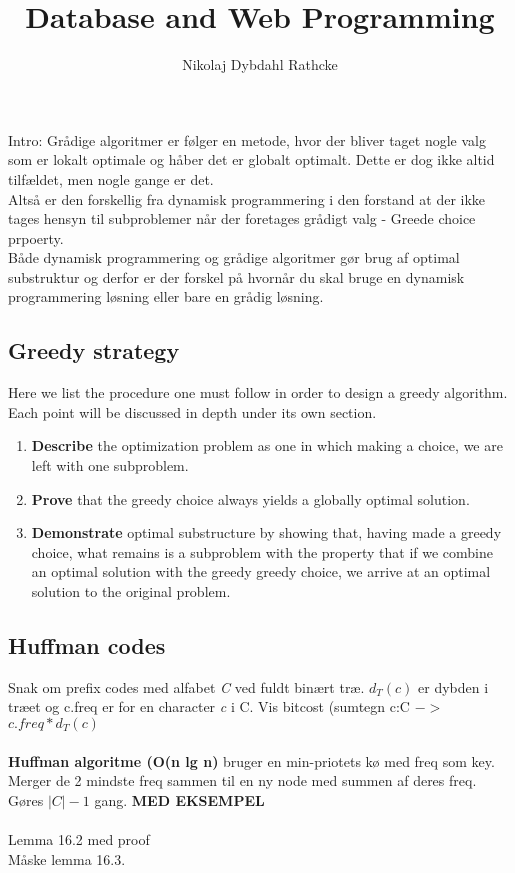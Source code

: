 \documentclass[12pt]{article}
\title{Database and Web Programming}
\author{Nikolaj Dybdahl Rathcke}
\begin{document}
Intro: Grådige algoritmer er følger en metode, hvor der bliver taget nogle valg som er lokalt optimale og håber det er globalt optimalt. Dette er dog ikke altid tilfældet, men nogle gange er det.\\
Altså er den forskellig fra dynamisk programmering i den forstand at der ikke tages hensyn til subproblemer når der foretages grådigt valg - Greede choice prpoerty.\\
Både dynamisk programmering og grådige algoritmer gør brug af optimal substruktur og derfor er der forskel på hvornår du skal bruge en dynamisk programmering løsning eller bare en grådig løsning.

\subsection*{Greedy strategy}
Here we list the procedure one must follow in order to design a greedy
algorithm. Each point will be discussed in depth under its own section.
\begin{enumerate}
	\item \textbf{Describe} the optimization problem as one in which making a
choice, we are left with one subproblem.
	\item \textbf{Prove} that the greedy choice always yields a globally
optimal solution.
	\item \textbf{Demonstrate} optimal substructure by showing that, having
made a greedy choice, what remains is a subproblem with the property that if
we combine an optimal solution with the greedy greedy choice, we arrive at an
optimal solution to the original problem.
\end{enumerate}

\subsection*{Huffman codes}
Snak om prefix codes med alfabet \textit{C} ved fuldt binært træ. $d_T(c)$ er dybden i træet og c.freq er for en character \textit{c} i C. Vis bitcost (sumtegn c:C $->$ $c.freq*d_T(c)$\\
\\
\textbf{Huffman algoritme (O(n lg n)} bruger en min-priotets kø med freq som key. Merger de 2 mindste freq sammen til en ny node med summen af deres freq. Gøres $|C|-1$ gang. \textbf{MED EKSEMPEL}\\
\\
Lemma 16.2 med proof\\
Måske lemma 16.3.
\end{document}
